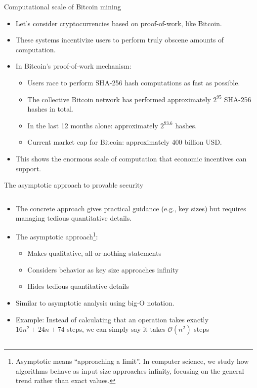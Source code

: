 \documentclass[aspectratio=169, lualatex, handout]{beamer}
\begin{document}
\begin{frame}{Computational scale of Bitcoin mining}
	\begin{itemize}
		\item Let's consider cryptocurrencies based on proof-of-work, like Bitcoin.
		\item These systems incentivize users to perform truly obscene amounts of computation.
		\item In Bitcoin's proof-of-work mechanism:
		      \begin{itemize}
			      \item Users race to perform SHA-256 hash computations as fast as possible.
			      \item The collective Bitcoin network has performed approximately $2^{95}$ SHA-256 hashes in total.
			      \item In the last 12 months alone: approximately $2^{93.6}$ hashes.
			      \item Current market cap for Bitcoin: approximately 400 billion USD.
		      \end{itemize}
		\item This shows the enormous scale of computation that economic incentives can support.
	\end{itemize}
\end{frame}

\begin{frame}{The asymptotic approach to provable security}
	\begin{columns}
		\begin{column}{1\textwidth}
			\begin{itemize}
				\item The concrete approach gives practical guidance (e.g., key sizes) but requires managing tedious quantitative details.
				\item The asymptotic approach\footnote{Asymptotic means ``approaching a limit''. In computer science, we study how algorithms behave as input size approaches infinity, focusing on the general trend rather than exact values.}:
				      \begin{itemize}
					      \item Makes qualitative, all-or-nothing statements
					      \item Considers behavior as key size approaches infinity
					      \item Hides tedious quantitative details
				      \end{itemize}
				\item Similar to asymptotic analysis using big-O notation.
				\item Example: Instead of calculating that an operation takes exactly $16n^2 + 24n + 74$ steps, we can simply say it takes $\mathcal{O}(n^2)$ steps
			\end{itemize}
		\end{column}
	\end{columns}
\end{frame}
\end{document}
